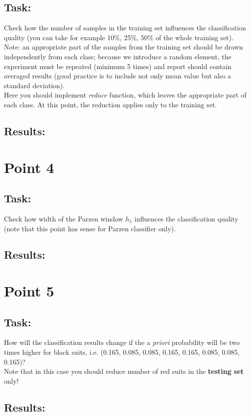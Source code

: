 \documentclass[
  a4paper,            %
  DIV=10,             %
  oneside,            %
  BCOR=5mm,           %
  parskip=half,       %
  numbers=noenddot,   %
  bibtotoc,           %
  listof=totoc        %
]{scrreprt}
\begin{document}
\subsection*{Task:}
Check how the number of samples in the training set influences the classification quality (you can take for example 10\%, 25\%, 50\% of the whole training set).
\\
Note: an appropriate part of the samples from the training set should be drawn independently from each class; because we introduce a random element, the experiment must be repeated (minimum 5 times) and report should contain averaged results (good practice is to include not only mean value but also a standard deviation).
\\
Here you should implement \textit{reduce} function, which leaves the appropriate part of each class.
At this point, the reduction applies only to the training set.
\subsection*{Results:}

\section*{Point 4}
\subsection*{Task:}
Check how width of the Parzen window $h_{1}$ influences the classification quality (note that this point has sense for Parzen classifier only).
\subsection*{Results:}

\section*{Point 5}
\subsection*{Task:}
How will the classification results change if the a \textit{priori} probability will be two times higher for black suits, i.e. (0.165, 0.085, 0.085, 0.165, 0.165, 0.085, 0.085, 0.165)?
\\
Note that in this case you should reduce number of red suits in the \textbf{testing set} only!
\subsection*{Results:}
\end{document}
